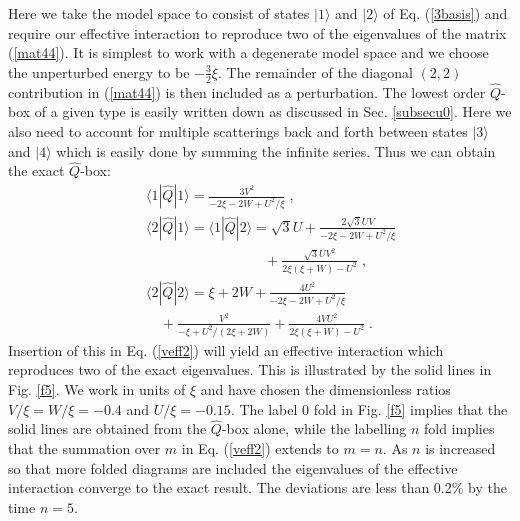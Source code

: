 \documentclass[prc,aps,amsmath,amssymb,preprintnumbers,showpacs,twocolumn]{revtex4}
\def\threehalf{{\textstyle{\frac{3}{2}}}}
\newcommand{\bq}{\begin{eqnarray}}
\newcommand{\eq}{\end{eqnarray}}
\begin{document}
Here we take the model space to consist of states $|1\rangle$ and
$|2\rangle$ of Eq. (\ref{3basis}) and require our effective interaction
to reproduce two of the eigenvalues of the matrix (\ref{mat44}). It is 
simplest to work with a degenerate model space and we choose the 
unperturbed energy to be $-\threehalf\xi$. The remainder of the 
diagonal $(2,2)$ contribution
in (\ref{mat44}) is then included as a perturbation. The lowest order 
$\hat{Q}$-box of a given type is easily written down as discussed in 
Sec. \ref{subsecu0}. Here we also need to account for multiple scatterings 
back and forth between states $|3\rangle$ and $|4\rangle$ which is 
easily done by summing the infinite series. Thus we can obtain the
exact $\hat{Q}$-box:
\bq
&&\langle1|\hat{Q}|1\rangle=\frac{3V^2}{-2\xi-2W+U^2/\xi}\;,\nonumber\\
&&\langle2|\hat{Q}|1\rangle=\langle1|\hat{Q}|2\rangle=\sqrt{3}U+
\frac{2\sqrt{3}UV}{-2\xi-2W+U^2/\xi}\nonumber\\
&&\qquad\qquad\qquad\qquad\ \ +\frac{\sqrt{3}UV^2}{2\xi(\xi+W)-U^2}
\;,\nonumber\\
&&\langle2|\hat{Q}|2\rangle=\xi+2W+\frac{4U^2}{-2\xi-2W+U^2/\xi}
\nonumber\\
&&\quad+\frac{V^2}{-\xi+U^2/(2\xi+2W)}+\frac{4VU^2}{2\xi(\xi+W)-U^2}\;.
\label{q4u}
\eq
Insertion of this in Eq. (\ref{veff2}) will yield an effective interaction
which reproduces two of the exact eigenvalues.
This is illustrated by the solid lines in Fig. \ref{f5}. We work in units 
of $\xi$ and have 
chosen the dimensionless ratios  $V/\xi=W/\xi=-0.4$ and $U/\xi=-0.15$. 
The label 0 fold in Fig. \ref{f5} implies that the solid lines are obtained 
from the $\hat{Q}$-box alone, while the labelling $n$ fold implies that
the summation over $m$ in Eq. (\ref{veff2}) extends to $m=n$. As $n$ is 
increased so that more folded diagrams are included the eigenvalues of the 
effective interaction converge to the exact result. The deviations 
are less than 0.2\% by the time $n=5$.
\end{document}
